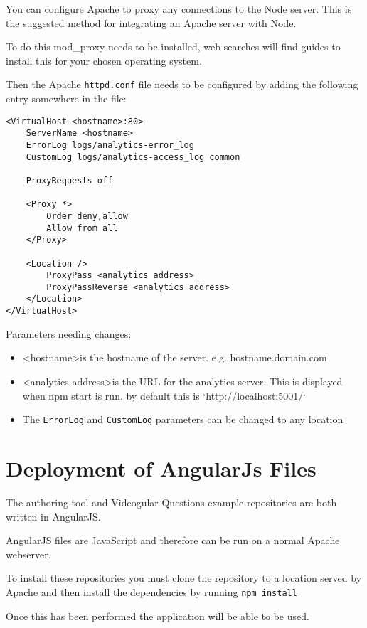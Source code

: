 You can configure Apache to proxy any connections to the Node server. This is the suggested method for integrating an Apache server with Node.

To do this mod\_proxy needs to be installed, web searches will find guides to install this for your chosen operating system.

Then the Apache \lstinline|httpd.conf| file needs to be configured by adding the following entry somewhere in the file:

\begin{lstlisting}[caption={Apache configuration}, label={code:apacheConfig_nodejs}]
<VirtualHost <hostname>:80>
	ServerName <hostname>
	ErrorLog logs/analytics-error_log
	CustomLog logs/analytics-access_log common

	ProxyRequests off
	
	<Proxy *>
		Order deny,allow
		Allow from all
	</Proxy>

	<Location />
		ProxyPass <analytics address>
		ProxyPassReverse <analytics address>
	</Location>
</VirtualHost>
\end{lstlisting}

Parameters needing changes:

\begin{itemize}
\item \textless hostname\textgreater is the hostname of the server. e.g. hostname.domain.com
\item \textless analytics address\textgreater is the URL for the analytics server. This is displayed when npm start is run. by default this is `http://localhost:5001/`
\item The \lstinline|ErrorLog| and \lstinline|CustomLog| parameters can be changed to any location
\end{itemize}

\section{Deployment of AngularJs Files} \label{Section:Deployment of AngularJs Files}

The authoring tool and \gls{Videogular} Questions example repositories are both written in AngularJS.

AngularJS files are JavaScript and therefore can be run on a normal Apache webserver.

To install these repositories you must clone the repository to a location served by Apache and then install the dependencies by running \lstinline|npm install|

Once this has been performed the application will be able to be used.